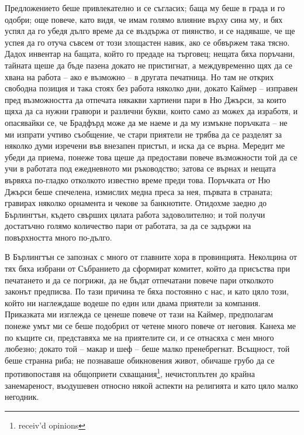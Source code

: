\documentclass[12pt]{book}
\begin{document}
Предложението беше привлекателно и се съгласих; баща му беше в града и го одобри; още повече, като видя, че имам голямо влияние върху сина му, и бях успял да го убедя дълго време да се въздържа от пиянство, и се надяваше, че ще успея да го отуча съвсем от този злощастен навик, ако се обвържем така тясно. Дадох инвентар на бащата, който го предаде на търговец; нещата бяха поръчани, тайната щеше да бъде пазена докато не пристигнат, а междувременно щях да се хвана на работа – ако е възможно – в другата печатница. Но там не открих свободна позиция и така стоях без работа няколко дни, докато Каймер – изправен пред възможността да отпечата някакви хартиени пари в Ню Джърси, за които щяха да са нужни гравюри и различни букви, които само аз можех да изработя, и опасявайки се, че Брадфърд може да ме наеме и да му измъкне поръчката – не ми изпрати учтиво съобщение, че стари приятели не трябва да се разделят за няколко думи изречени във внезапен пристъп, и иска да се върна. Мередит ме убеди да приема, понеже това щеше да предостави повече възможности той да се учи в работата под ежедневното ми ръководство; затова се върнах и нещата вървяха по-гладко отколкото известно време преди това. Поръчката от Ню Джърси беше спечелена, измислих медна преса за нея, първата в страната; гравирах няколко орнамента и чекове за банкнотите. Отидохме заедно до Бърлингтън, където свърших цялата работа задоволително; и той получи достатъчно голямо количество пари от работата, за да се задържи на повърхността много по-дълго.

В Бърлингтън се запознах с много от главните хора в провинцията. Неколцина от тях бяха избрани от Събранието да сформират комитет, който да присъства при печатането и да се погрижи, да не бъдат отпечатани повече пари отколкото законът предписва. По тази причина те бяха постоянно с нас, и като цяло този, който ни наглеждаше водеше по един или двама приятели за компания. Приказката ми изглежда се ценеше повече от тази на Каймер, предполагам понеже умът ми се беше подобрил от четене много повече от неговия. Канеха ме по къщите си, представяха ме на приятелите си, и се отнасяха с мен много любезно; докато той – макар и шеф – беше малко пренебрегнат. Всъщност, той беше странна риба; не познаваше обикновения живот, обичаше грубо да се противопоставя на общоприети схващания\footnote{ receiv'd opinions}, нечистоплътен до крайна занемареност, въодушевен относно някой аспекти на религията и като цяло малко негодник. 
\end{document}

